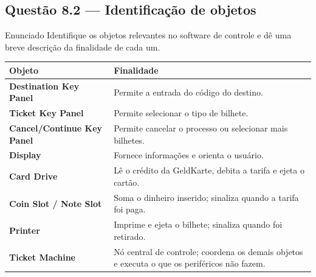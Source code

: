 \documentclass[11pt,a4paper]{article}
\begin{document}
\subsection*{Questão 8.2 — Identificação de objetos}
\begin{questao}{Enunciado}
Identifique os objetos relevantes no software de controle e dê uma breve
descrição da finalidade de cada um.
\end{questao}
\begin{resposta}
\begin{center}\small
\begin{tabular}{@{}>{\bfseries}p{4.0cm}p{10.4cm}@{}}
\toprule
Objeto & Finalidade \\
\midrule
Destination Key Panel & Permite a entrada do código do destino. \\
Ticket Key Panel & Permite selecionar o tipo de bilhete. \\
Cancel/Continue Key Panel & Permite cancelar o processo ou selecionar mais bilhetes. \\
Display & Fornece informações e orienta o usuário. \\
Card Drive & Lê o crédito da GeldKarte, debita a tarifa e ejeta o cartão. \\
Coin Slot / Note Slot & Soma o dinheiro inserido; sinaliza quando a tarifa foi paga. \\
Printer & Imprime e ejeta o bilhete; sinaliza quando foi retirado. \\
Ticket Machine & Nó central de controle; coordena os demais objetos e executa o que os periféricos não fazem. \\
\bottomrule
\end{tabular}
\end{center}
\end{resposta}

\end{document}
